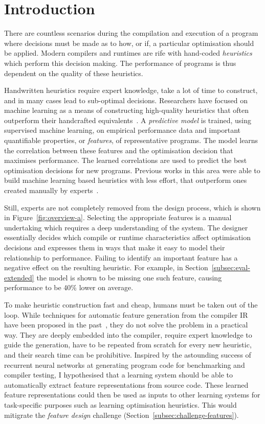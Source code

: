 \section{Introduction}

There are countless scenarios during the compilation and execution of a program where decisions must be made as to how, or if, a particular optimisation should be applied. Modern compilers and runtimes are rife with hand-coded \emph{heuristics} which perform this decision making. The performance of programs is thus dependent on the quality of these heuristics.

Handwritten heuristics require expert knowledge, take a lot of time to construct, and in many cases lead to sub-optimal decisions. Researchers have focused on machine learning as a means of constructing high-quality heuristics that often outperform their handcrafted equivalents~\cite{Micolet2016,Falch2015,Stephenson2005,Agakov,Cummins2016a}. A \emph{predictive model} is trained, using supervised machine learning, on empirical performance data and important quantifiable properties, or \emph{features}, of representative programs. The model learns the correlation between these features and the optimisation decision that maximises performance. The learned correlations are used to predict the best optimisation decisions for new programs. Previous works in this area were able to build machine learning based heuristics with less effort, that outperform ones created manually by experts~\cite{Grewe2013,Magni2014}.

Still, experts are not completely removed from the design process, which is shown in Figure~\ref{fig:overview-a}. Selecting the appropriate features is a manual undertaking which requires a deep understanding of the system. The designer essentially decides which compile or runtime characteristics affect optimisation decisions and expresses them in ways that make it easy to model their relationship to performance. Failing to identify an important feature has a negative effect on the resulting heuristic. For example, in Section~\ref{subsec:eval-extended} the \citeauthor{Grewe2013} model is shown to be missing one such feature, causing performance to be 40\% lower on average.

To make heuristic construction fast and cheap, humans must be taken out of the loop. While techniques for automatic feature generation from the compiler IR have been proposed in the past~\cite{Namolaru2010a,Leather2014}, they do not solve the problem in a practical way. They are deeply embedded into the compiler, require expert knowledge to guide the generation, have to be repeated from scratch for every new heuristic, and their search time can be prohibitive. Inspired by the astounding success of recurrent neural networks at generating program code for benchmarking and compiler testing, I hypothesised that a learning system should be able to automatically extract feature representations from source code. These learned feature representations could then be used as inputs to other learning systems for task-specific purposes such as learning optimisation heuristics. This would mitigrate the \emph{feature design} challenge (Section~\ref{subsec:challenge-features}).

